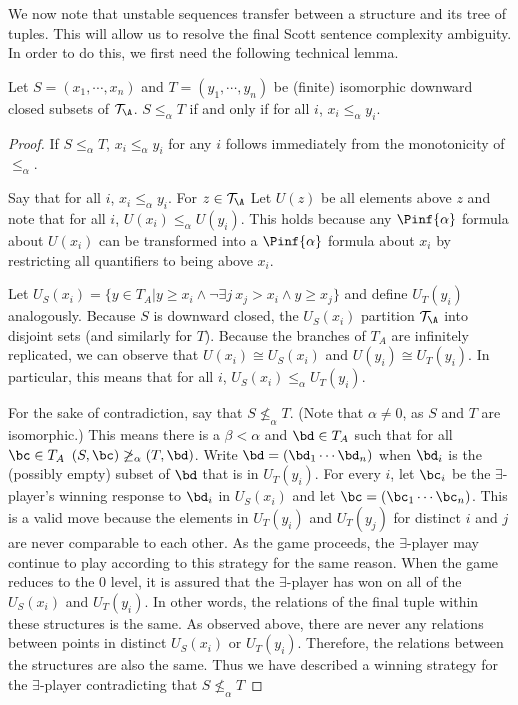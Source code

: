 \documentclass{amsart}
\newcommand{\T}{{\mathcal{T}}}
\begin{document}
We now note that unstable sequences transfer between a structure and its tree of tuples.
This will allow us to resolve the final Scott sentence complexity ambiguity.
In order to do this, we first need the following technical lemma.


\begin{lemma}\label{lemma:factoring}
Let $S=(x_1,\cdots,x_n)$ and $T=(y_1,\cdots,y_n)$ be (finite) isomorphic
downward closed subsets of $\T_\A$.
$S\leq_\alpha T$ if and only if for all $i$, $x_i\leq_\alpha y_i$. 
\end{lemma}


\begin{proof}
If $S\leq_\alpha T$, $x_i\leq_\alpha y_i$ for any $i$ follows immediately from the monotonicity of $\leq_\alpha$.


Say that for all $i$, $x_i\leq_\alpha y_i$.
For $z\in \T_\A$ Let $U(z)$ be all elements above $z$ and note that
for all $i$, $U(x_i)\leq_\alpha U(y_i)$.
This holds because any $\Pinf{\alpha}$ formula about $U(x_i)$ can be transformed into a $\Pinf{\alpha}$ formula about $x_i$ by restricting all quantifiers to being above $x_i$.

Let $U_S(x_i) = \{y\in T_A\vert y\geq x_i \land \lnot\exists j ~ x_j>x_i \land y\geq x_j\}$ and define $U_T(y_i)$ analogously.
Because $S$ is downward closed, the $U_S(x_i)$ partition $\T_\A$ into disjoint sets (and similarly for $T$).
Because the branches of $T_A$ are infinitely replicated, we can observe that $U(x_i)\cong U_S(x_i)$ and $U(y_i)\cong U_T(y_i)$.
In particular, this means that for all $i$, $U_S(x_i)\leq_\alpha U_T(y_i)$.

For the sake of contradiction, say that $S\not\leq_\alpha T$.
(Note that $\alpha\neq0$, as $S$ and $T$ are isomorphic.)
This means there is a $\beta<\alpha$ and $\bd\in T_A$ such that for all $\bc\in T_A$
$(S,\bc)\not\geq_\alpha (T,\bd)$.
Write $\bd=(\bd_1\cdots\bd_n)$ when $\bd_i$ is the (possibly empty) subset of
$\bd$ that is in $U_T(y_i)$. For every $i$, let $\bc_i$ be the $\exists$-player's winning response to $\bd_i$ in $U_S(x_i)$ and let $\bc=(\bc_1\cdots \bc_n)$.
This is a valid move because the elements in  $U_T(y_i)$ and $U_T(y_j)$ for distinct $i$ and $j$ are never comparable to each other. 
As the game proceeds, the $\exists$-player may continue to play according to this strategy for the same reason.
When the game reduces to the $0$ level, it is assured that the $\exists$-player has won on all of the $U_S(x_i)$ and  $U_T(y_i)$.
In other words, the relations of the final tuple within these structures is the same.
As observed above, there are never any relations between points in distinct $U_S(x_i)$ or  $U_T(y_i)$.
Therefore, the relations between the structures are also the same.
Thus we have described a winning strategy for the $\exists$-player contradicting
that $S\not\leq_\alpha T$
\end{proof}
\end{document}
